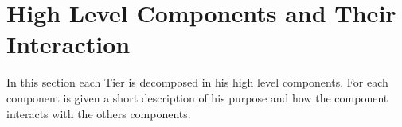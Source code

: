 \documentclass[../../../../dd.tex]{subfiles}
\begin{document}
	\section{High Level Components and Their Interaction}
		In this section each Tier is decomposed in his high level components. For each component is given a short description of his purpose and how the component interacts with the others components.
	
		

		

		
	
\end{document}

